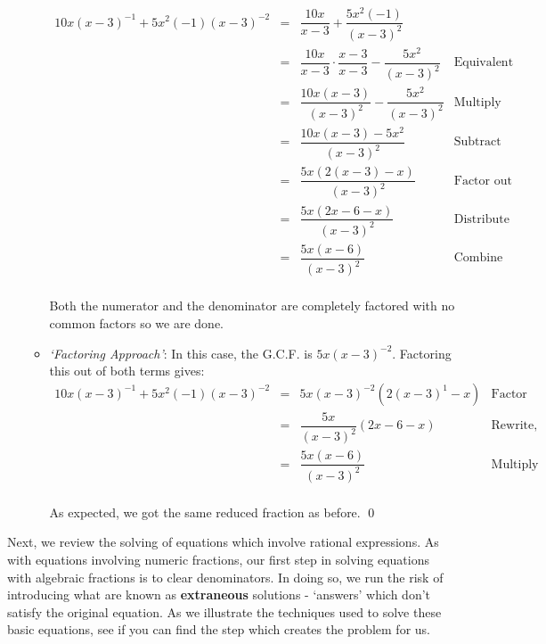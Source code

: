 \documentclass{ximera}
\begin{document}
\begin{example}
\begin{enumerate}
\begin{itemize}
\[\begin{array}{rclr}
10x(x-3)^{-1} + 5x^2(-1)(x-3)^{-2} & = & \dfrac{10x}{x-3} + \dfrac{5x^2(-1)}{(x-3)^2} & \\ [10pt]
                                   & = & \dfrac{10x}{x-3} \cdot \dfrac{x-3}{x-3} - \dfrac{5x^2}{(x-3)^2} & \text{Equivalent Fractions} \\ [10pt]
																	 & = & \dfrac{10x(x-3)}{(x-3)^2} - \dfrac{5x^2}{(x-3)^2} & \text{Multiply} \\ [10pt]
																	 & = & \dfrac{10x(x-3) - 5x^2}{(x-3)^2} & \text{Subtract} \\ [10pt]
																	 & = & \dfrac{5x(2(x-3) - x)}{(x-3)^2} & \text{Factor out G.C.F.} \\ [10pt]
																	 & = & \dfrac{5x(2x-6-x)}{(x-3)^2} & \text{Distribute} \\ [10pt]
																	 & = & \dfrac{5x(x-6)}{(x-3)^2} & \text{Combine like terms} \\
																	
\end{array} \]

Both the numerator and the denominator are completely factored with no common factors so we are done.

\item  \textit{`Factoring Approach'}: In this case, the G.C.F. is $5x(x-3)^{-2}$.  Factoring this out of both terms gives: \[ \begin{array}{rclr}

10x(x-3)^{-1} + 5x^2(-1)(x-3)^{-2} & = & 5x(x-3)^{-2}(2(x-3)^{1} - x) & \text{Factor} \\ [8pt]
                                  & = & \dfrac{5x}{(x-3)^2} (2x-6 - x) & \text{Rewrite, distribute}\\ [12pt]
																	& = & \dfrac{5x(x-6)}{(x-3)^2} & \text{Multiply}\\ \end{array}\]

As expected, we got the same reduced fraction as before. \qed
\end{itemize}
																
\end{enumerate}

\end{example}


Next, we review the solving of equations which involve rational expressions.  As with equations involving numeric fractions, our first step in solving equations with algebraic fractions is to clear denominators.  In doing so, we run the risk of introducing what are known as \textbf{extraneous} solutions - `answers' which don't satisfy the original equation.  As we illustrate the techniques used to solve these basic equations, see if you can find the step which creates the problem for us.
\end{document}
